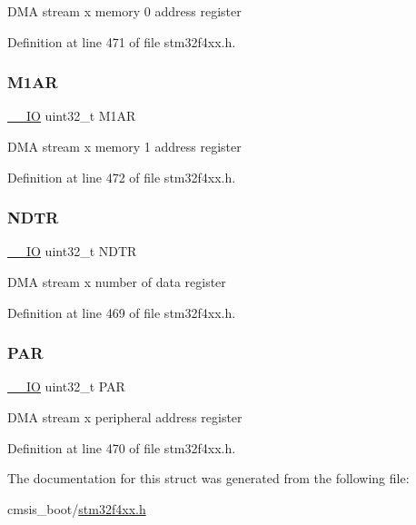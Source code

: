 D\+MA stream x memory 0 address register 

Definition at line 471 of file stm32f4xx.\+h.

\mbox{\label{struct_d_m_a___stream___type_def_aee7782244ceb4791d9a3891804ac47ac}} 
\subsubsection{\texorpdfstring{M1\+AR}{M1AR}}
{\footnotesize\ttfamily \hyperlink{group___c_m_s_i_s__core__definitions_gaec43007d9998a0a0e01faede4133d6be}{\+\_\+\+\_\+\+IO} uint32\+\_\+t M1\+AR}

D\+MA stream x memory 1 address register 

Definition at line 472 of file stm32f4xx.\+h.

\mbox{\label{struct_d_m_a___stream___type_def_af60258ad5a25addc1e8969665d0c1731}} 
\subsubsection{\texorpdfstring{N\+D\+TR}{NDTR}}
{\footnotesize\ttfamily \hyperlink{group___c_m_s_i_s__core__definitions_gaec43007d9998a0a0e01faede4133d6be}{\+\_\+\+\_\+\+IO} uint32\+\_\+t N\+D\+TR}

D\+MA stream x number of data register 

Definition at line 469 of file stm32f4xx.\+h.

\mbox{\label{struct_d_m_a___stream___type_def_aef55be3d948c22dd32a97e8d4f8761fd}} 
\subsubsection{\texorpdfstring{P\+AR}{PAR}}
{\footnotesize\ttfamily \hyperlink{group___c_m_s_i_s__core__definitions_gaec43007d9998a0a0e01faede4133d6be}{\+\_\+\+\_\+\+IO} uint32\+\_\+t P\+AR}

D\+MA stream x peripheral address register 

Definition at line 470 of file stm32f4xx.\+h.



The documentation for this struct was generated from the following file\+:\begin{DoxyCompactItemize}
\item 
cmsis\+\_\+boot/\hyperlink{stm32f4xx_8h}{stm32f4xx.\+h}\end{DoxyCompactItemize}
